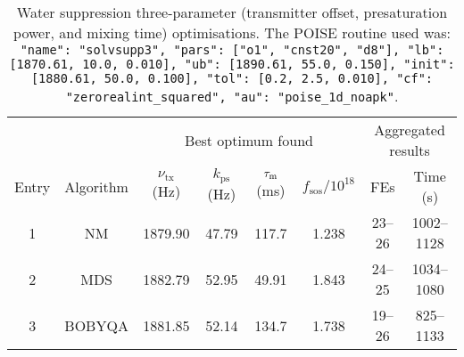 \begin{table}
    \centering
    \begin{tabular}{cccccccc}
        \toprule
              &           & \multicolumn{4}{c}{Best optimum found} & \multicolumn{2}{c}{Aggregated results} \\
                            \cmidrule(lr){3-6}                       \cmidrule(lr){7-8}
        Entry & Algorithm & $\nu_\text{tx}$ (\unit{\Hz}) & $k_\text{ps}$ (\unit{\Hz}) & $\tau_\mathrm{m}$ (\unit{\ms}) & $f_\text{sos} / 10^{18}$ & FEs    & Time (\unit{\s}) \\
        \midrule
        1     & NM        & 1879.90                    & 47.79          & 117.7              & 1.238                    & 23--26 & 1002--1128     \\
        2     & MDS       & 1882.79                    & 52.95          & 49.91              & 1.843                    & 24--25 & 1034--1080     \\
        3     & BOBYQA    & 1881.85                    & 52.14          & 134.7              & 1.738                    & 19--26 & 825--1133      \\
        \bottomrule
    \end{tabular}
    \caption[Water suppression three-parameter optimisations]{
        Water suppression three-parameter (transmitter offset, presaturation power, and mixing time) optimisations.
        The POISE routine used was: \texttt{{"name": "solvsupp3", "pars": ["o1", "cnst20", "d8"], "lb": [1870.61, 10.0, 0.010], "ub": [1890.61, 55.0, 0.150], "init": [1880.61, 50.0, 0.100], "tol": [0.2, 2.5, 0.010], "cf": "zerorealint_squared", "au": "poise_1d_noapk"}}.
    }
    \label{tbl:poise_solvsupp3p}
\end{table}

